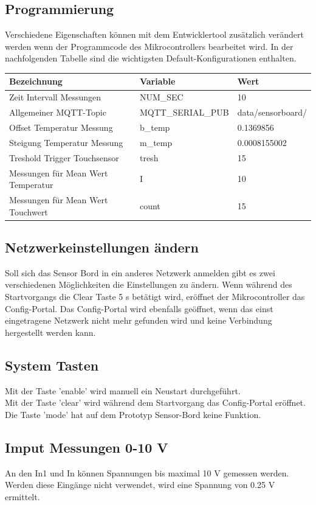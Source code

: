 \subsection{Programmierung}
Verschiedene Eigenschaften können mit dem Entwicklertool zusätzlich verändert werden wenn der Programmcode des Mikrocontrollers bearbeitet wird. In der nachfolgenden Tabelle sind die wichtigsten Default-Konfigurationen enthalten.
\begin{table}[H]
	\centering
	\begin{tabular}{|l|l|l|}
		\hline 
		Bezeichnung & Variable & Wert \\ 
		\hline 
		Zeit Intervall Messungen & NUM\_SEC & 10 \\ 
		\hline 
		Allgemeiner MQTT-Topic  & MQTT\_SERIAL\_PUB& data/sensorboard/ \\ 
		\hline 
		Offset Temperatur Messung & b\_temp & 0.1369856 \\ 
		\hline  
		Steigung Temperatur Messung & m\_temp & 0.0008155002 \\ 
		\hline  
		Treshold Trigger Touchsensor & tresh& 15 \\ 
		\hline
		Messungen für Mean Wert Temperatur & I & 10 \\ 
		\hline  
		Messungen für Mean Wert Touchwert & count & 15 \\ 
		\hline  
	\end{tabular} 	
\end{table}
\subsection{Netzwerkeinstellungen ändern}
Soll sich das Sensor Bord in ein anderes Netzwerk anmelden gibt es zwei verschiedenen Möglichkeiten die Einstellungen zu ändern. Wenn während des Startvorgangs die Clear Taste 5 s betätigt wird, eröffnet der Mikrocontroller das Config-Portal. Das Config-Portal wird ebenfalls geöffnet, wenn das einst eingetragene Netzwerk nicht mehr gefunden wird und keine Verbindung hergestellt werden kann.
\subsection{System Tasten}
Mit der Taste 'enable' wird manuell ein Neustart durchgeführt. \\
Mit der Taste 'clear' wird während dem Startvorgang das Config-Portal eröffnet. \\
Die Taste 'mode' hat auf dem Prototyp Sensor-Bord keine Funktion.
\subsection{Imput Messungen 0-10 V}
An den In1 und In können Spannungen bis maximal 10 V gemessen werden. Werden diese Eingänge nicht verwendet, wird eine Spannung von 0.25 V ermittelt.
